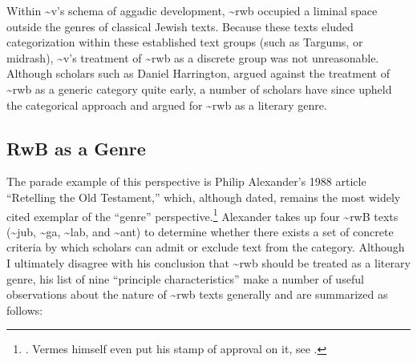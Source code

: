 Within \textasciitilde{}v's schema of aggadic development,
\textasciitilde{}rwb occupied a liminal space outside the genres of
classical Jewish texts. Because these texts eluded categorization within
these established text groups (such as Targums, or midrash),
\textasciitilde{}v's treatment of \textasciitilde{}rwb as a discrete
group was not unreasonable. Although scholars such as Daniel Harrington,
argued against the treatment of \textasciitilde{}rwb as a generic
category quite early,\autocite{harrington_kraft-nickelsburg1986} a
number of scholars have since upheld the categorical approach and argued
for \textasciitilde{}rwb as a literary genre.

\subsection{RwB as a Genre}\label{rwb-as-a-genre}

The parade example of this perspective is Philip Alexander's 1988
article ``Retelling the Old Testament,'' which, although dated, remains
the most widely cited exemplar of the ``genre'' perspective.\footnote{\textcite{alexander_carson-williamson1988}.
  Vermes himself even put his stamp of approval on it, see
  \textcite[4]{vermes_zsengeller2014}.} Alexander takes up four
\textasciitilde{}rwB texts (\textasciitilde{}jub, \textasciitilde{}ga,
\textasciitilde{}lab, and \textasciitilde{}ant) to determine whether
there exists a set of concrete criteria by which scholars can admit or
exclude text from the category. Although I ultimately disagree with his
conclusion that \textasciitilde{}rwb should be treated as a literary
genre, his list of nine ``principle characteristics'' make a number of
useful observations about the nature of \textasciitilde{}rwb texts
generally and are summarized as follows:

